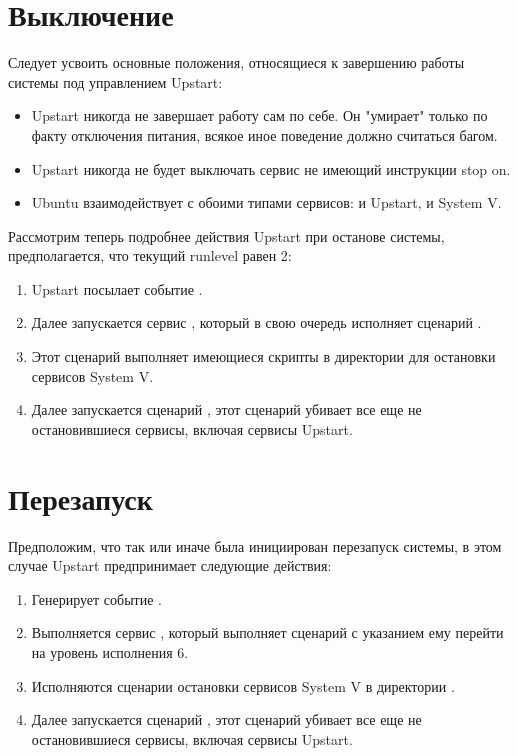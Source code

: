\section{Выключение}
Следует усвоить основные положения, относящиеся к завершению работы системы под управлением Upstart: \begin{itemize}
\item Upstart никогда не завершает работу сам по себе. Он "умирает" только по факту отключения питания, 
всякое иное поведение должно считаться багом.
\item Upstart никогда не будет выключать сервис не имеющий инструкции stop on.
\item Ubuntu взаимодействует с обоими типами сервисов: и Upstart, и System V.
\end{itemize}

Рассмотрим теперь подробнее действия Upstart при останове системы, предполагается, что текущий runlevel равен 2: \begin{enumerate}
\item Upstart посылает событие .
\item Далее запускается сервис , который в свою очередь исполняет сценарий .
\item Этот сценарий выполняет имеющиеся скрипты в директории  для остановки сервисов System V.
\item Далее запускается сценарий , этот сценарий убивает все еще не остановившиеся сервисы, включая сервисы Upstart.
\end{enumerate}
\section{Перезапуск}
Предположим, что так или иначе была инициирован перезапуск системы, в этом случае Upstart предпринимает следующие действия: \begin{enumerate}
\item Генерирует событие .
\item Выполняется сервис , который выполняет сценарий  с указанием ему перейти на уровень исполнения 6. 
\item Исполняются сценарии остановки сервисов System V в директории .
\item Далее запускается сценарий , этот сценарий убивает все еще не остановившиеся сервисы, включая сервисы Upstart.
\end{enumerate}

